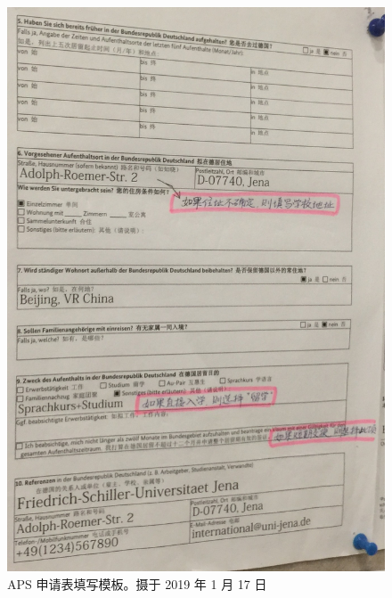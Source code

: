 \documentclass[oneside,final]{book}
\begin{document}
\begin{appendices}
\begin{figure}[htbp]
  \includegraphics[width=\textwidth]{APS-forms}
  \caption{APS 申请表填写模板。摄于 2019 年 1 月 17 日}
  \label{fig:APS-forms}
\end{figure}


\end{appendices}
\end{document}
